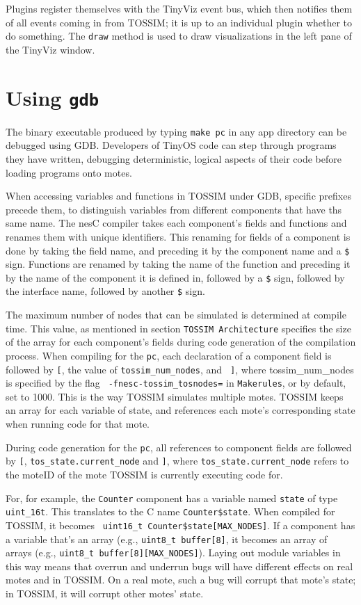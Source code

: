 \documentclass[10pt,fleqn]{article}
\def\sim{TOSSIM\xspace}
\def\tinyviz{TinyViz\xspace}
\begin{document}
Plugins register themselves with the \tinyviz event bus, which then
notifies them of all events coming in from TOSSIM; it is up to an
individual plugin whether to do something. The {\tt draw} method is
used to draw visualizations in the left pane of the TinyViz window.


\section{Using {\tt gdb}}

The binary executable produced by typing {\tt make pc} in any app
directory can be debugged using GDB. Developers of TinyOS code can
step through programs they have written, debugging deterministic,
logical aspects of their code before loading programs onto motes.

When accessing variables and functions in \sim under GDB, specific
prefixes precede them, to distinguish variables from different
components that have ths same name.  The nesC compiler takes each
component's fields and functions and renames them with unique
identifiers. This renaming for fields of a component is done by taking
the field name, and preceding it by the component name and a {\tt \$}
sign. Functions are renamed by taking the name of the function and
preceding it by the name of the component it is defined in, followed
by a {\tt \$} sign, followed by the interface name, followed by
another {\tt \$} sign.

The maximum number of nodes that can be simulated is determined at
compile time.  This value, as mentioned in section {\tt \sim
Architecture} specifies the size of the array for each component's
fields during code generation of the compilation process. When
compiling for the {\tt pc}, each declaration of a component field is
followed by {\tt [}, the value of {\tt tossim\_num\_nodes}, and {\tt
]}, where tossim\_num\_nodes is specified by the flag {\tt
-fnesc-tossim\_tosnodes=} in {\tt Makerules}, or by default, set to
1000.  This is the way \sim simulates multiple motes. \sim keeps an
array for each variable of state, and references each mote's
corresponding state when running code for that mote.

During code generation for the {\tt pc}, all references to component
fields are followed by {\tt [}, {\tt tos\_state.current\_node} and
{\tt ]}, where {\tt tos\_state.current\_node} refers to the moteID of
the mote \sim is currently executing code for.

For, for example, the {\tt Counter} component has a variable named
{\tt state} of type {\tt uint\_16t}. This translates to the C name
{\tt Counter\$state}. When compiled for \sim, it becomes {\tt
uint16\_t Counter\$state[MAX\_NODES]}. If a component has a variable
that's an array (e.g., {\tt uint8\_t buffer[8]}, it becomes an array of
arrays (e.g., {\tt uint8\_t buffer[8][MAX\_NODES]}). Laying out module
variables in this way means that overrun and underrun bugs will have
different effects on real motes and in TOSSIM. On a real mote, such a
bug will corrupt that mote's state; in TOSSIM, it will corrupt other
motes' state.
\end{document}
